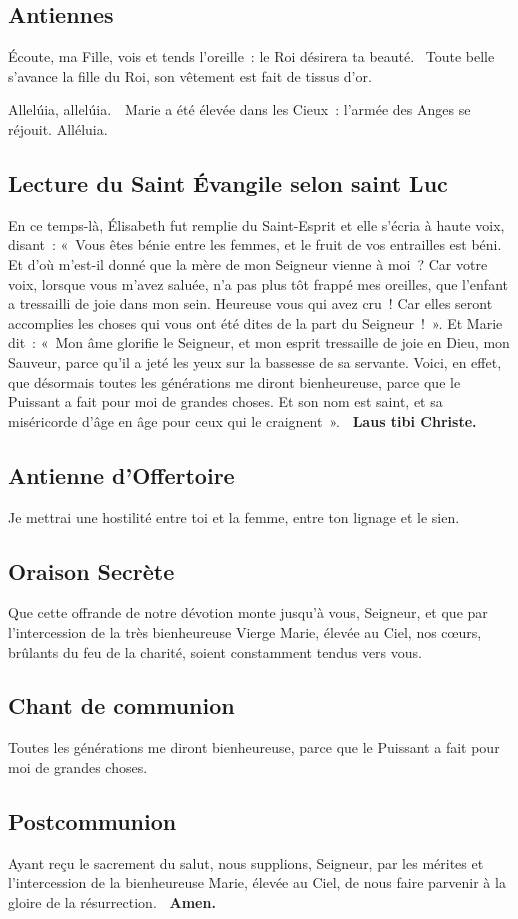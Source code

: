 \begin{multicols}{2}
\subsection*{Antiennes}
Écoute, ma Fille, vois et tends l’oreille : le Roi désirera ta beauté. \vb Toute belle s’avance la fille du Roi, son vêtement est fait de tissus d’or.

Allelúia, allelúia. \vb\ Marie a été élevée dans les Cieux : l’armée des Anges se réjouit. Alléluia.


\subsection*{Lecture du Saint Évangile selon saint Luc}
En ce temps-là, Élisabeth fut remplie du Saint-Esprit et elle s’écria à haute voix, disant : « Vous êtes bénie entre les femmes, et le fruit de vos entrailles est béni. Et d’où m’est-il donné que la mère de mon Seigneur vienne à moi ? Car votre voix, lorsque vous m’avez saluée, n’a pas plus tôt frappé mes oreilles, que l’enfant a tressailli de joie dans mon sein. Heureuse vous qui avez cru ! Car elles seront accomplies les choses qui vous ont été dites de la part du Seigneur ! ». Et Marie dit : « Mon âme glorifie le Seigneur, et mon esprit tressaille de joie en Dieu, mon Sauveur, parce qu’il a jeté les yeux sur la bassesse de sa servante. Voici, en effet, que désormais toutes les générations me diront bienheureuse, parce que le Puissant a fait pour moi de grandes choses. Et son nom est saint, et sa miséricorde d’âge en âge pour ceux qui le craignent ».
{\textbf {\rb\ Laus tibi Christe.}}


\subsection*{Antienne d'Offertoire}
Je mettrai une hostilité entre toi et la femme, entre ton lignage et le sien.

\subsection*{Oraison Secrète}
Que cette offrande de notre dévotion monte jusqu’à vous, Seigneur, et que par l’intercession de la très bienheureuse Vierge Marie, élevée au Ciel, nos cœurs, brûlants du feu de la charité, soient constamment tendus vers vous.

\subsection*{Chant de communion}
Toutes les générations me diront bienheureuse, parce que le Puissant a fait pour moi de grandes choses.

\subsection*{Postcommunion}
Ayant reçu le sacrement du salut, nous supplions, Seigneur, par les mérites et l’intercession de la bienheureuse Marie, élevée au Ciel, de nous faire parvenir à la gloire de la résurrection.
{\textbf {\rb\ Amen.}}
\end{multicols}
